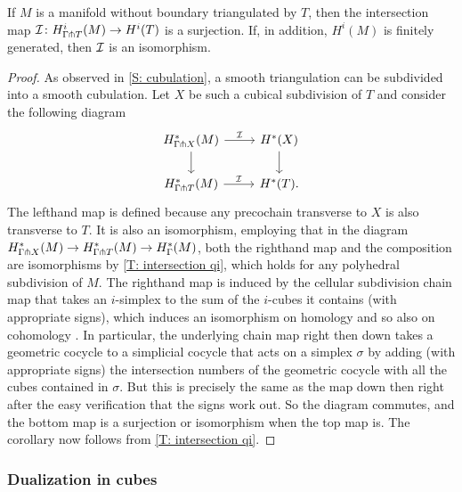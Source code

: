 \begin{corollary}\label{C: intersection simp qi}
	If $M$ is a manifold without boundary triangulated by $T$, then the intersection map $\mathcal{I} \colon H^i_{\Gamma \pitchfork T}(M) \to H^i(T)$ is a surjection.
	If, in addition, $H^i(M)$ is finitely generated, then $\mathcal{I}$ is an isomorphism.
\end{corollary}
\begin{proof}
	As observed in \cref{S: cubulation}, a smooth triangulation can be subdivided into a smooth cubulation.
	Let $X$ be such a cubical subdivision of $T$ and consider the following diagram
	\begin{equation*}
		\begin{tikzcd}
		 	H^*_{\Gamma \pf X}(M)\arrow[d] \arrow[r,"\mc I"] & H^*(X)  \arrow[d]   \\
			H^*_{\Gamma \pf T}(M)\arrow[r,"\mc I"]&  H^*(T).
		\end{tikzcd}
	\end{equation*}
	The lefthand map is defined because any precochain transverse to $X$ is also transverse to $T$.
	It is also an isomorphism, employing that in the diagram $H^*_{\Gamma \pitchfork X}(M) \to H^*_{\Gamma \pitchfork T}(M) \to H^*_\Gamma(M)$, both the righthand map and the composition are isomorphisms by \cref{T: intersection qi}, which holds for any polyhedral subdivision of $M$.
	The righthand map is induced by the cellular subdivision chain map that takes an $i$-simplex to the sum of the $i$-cubes it contains (with appropriate signs), which induces an isomorphism on homology and so also on cohomology \cite[Theorem 1.49]{Fenn}.
	In particular, the underlying chain map right then down takes a geometric cocycle to a simplicial cocycle that acts on a simplex $\sigma$ by adding (with appropriate signs) the intersection numbers of the geometric cocycle with all the cubes contained in $\sigma$. But this is precisely the same as the map down then right after the easy verification that the signs work out.
 	So the diagram commutes, and the bottom map is a surjection or isomorphism when the top map is.
	The corollary now follows from \cref{T: intersection qi}.
\end{proof}



\subsubsection{Dualization in cubes}\label{S: dual cubes}

